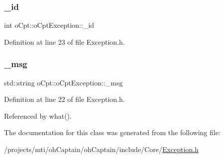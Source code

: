 \subsubsection{\texorpdfstring{\+\_\+id}{\_id}}
{\footnotesize\ttfamily int o\+Cpt\+::o\+Cpt\+Exception\+::\+\_\+id\hspace{0.3cm}{\ttfamily [private]}}



Definition at line 23 of file Exception.\+h.

\hypertarget{classo_cpt_1_1o_cpt_exception_a7d20b46357532fcde0c6f4614c636786}{}\label{classo_cpt_1_1o_cpt_exception_a7d20b46357532fcde0c6f4614c636786} 
\subsubsection{\texorpdfstring{\+\_\+msg}{\_msg}}
{\footnotesize\ttfamily std\+::string o\+Cpt\+::o\+Cpt\+Exception\+::\+\_\+msg\hspace{0.3cm}{\ttfamily [private]}}



Definition at line 22 of file Exception.\+h.



Referenced by what().



The documentation for this class was generated from the following file\+:\begin{DoxyCompactItemize}
\item 
/projects/mti/oh\+Captain/oh\+Captain/include/\+Core/\hyperlink{_exception_8h}{Exception.\+h}\end{DoxyCompactItemize}
